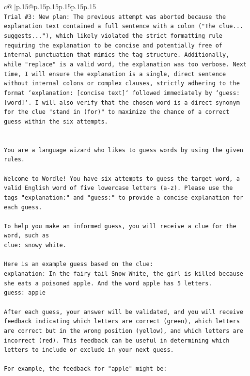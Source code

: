 \documentclass{article}
\begin{document}
{\begin{supertabular}{c@{$\;$}|p{.15\linewidth}@{}p{.15\linewidth}p{.15\linewidth}p{.15\linewidth}p{.15\linewidth}p{.15\linewidth}}
{{{\\ 
\texttt{Trial \#3: New plan: The previous attempt was aborted because the explanation text contained a full sentence with a colon ("The clue... suggests..."), which likely violated the strict formatting rule requiring the explanation to be concise and potentially free of internal punctuation that mimics the tag structure. Additionally, while "replace" is a valid word, the explanation was too verbose. Next time, I will ensure the explanation is a single, direct sentence without internal colons or complex clauses, strictly adhering to the format `explanation: {[}concise text{]}` followed immediately by `guess: {[}word{]}`. I will also verify that the chosen word is a direct synonym for the clue "stand in (for)" to maximize the chance of a correct guess within the six attempts.} \\
\\ 
\\ 
\texttt{You are a language wizard who likes to guess words by using the given rules.} \\
\\ 
\texttt{Welcome to Wordle! You have six attempts to guess the target word, a valid English word of five lowercase letters (a{-}z). Please use the tags "explanation:" and "guess:" to provide a concise explanation for each guess.} \\
\\ 
\texttt{To help you make an informed guess, you will receive a clue for the word, such as} \\
\texttt{clue: snowy white.} \\
\\ 
\texttt{Here is an example guess based on the clue:} \\
\texttt{explanation: In the fairy tail Snow White, the girl is killed because she eats a poisoned apple. And the word apple has 5 letters.} \\
\texttt{guess: apple} \\
\\ 
\texttt{After each guess, your answer will be validated, and you will receive feedback indicating which letters are correct (green), which letters are correct but in the wrong position (yellow), and which letters are incorrect (red). This feedback can be useful in determining which letters to include or exclude in your next guess.} \\
\\ 
\texttt{For example, the feedback for "apple" might be:} \\
}}}
\end{supertabular}}
\end{document}
